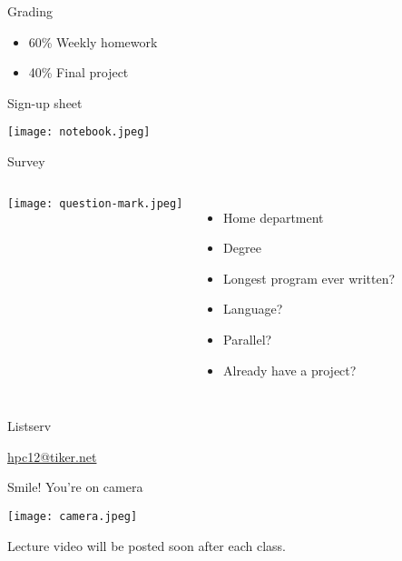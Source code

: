 \documentclass[english,compress]{beamer}
\begin{document}
\begin{frame}{Grading}
  \Large
  \begin{itemize}
    \item 60\% Weekly homework
    \item 40\% Final project
  \end{itemize}
\end{frame}
\begin{frame}{Sign-up sheet}
  \begin{center}
    \texttt{[image: notebook.jpeg]}
  \end{center}
\end{frame}
\begin{frame}{Survey}
  \begin{columns}
    \texttt{[image: question-mark.jpeg]}
    \begin{itemize}[<+->]
      \item Home department
      \item Degree
      \item Longest program ever written?
      \item Language?
      \item Parallel?
      \item Already have a project?
    \end{itemize}
  \end{columns}
\end{frame}
\begin{frame}{Listserv}
  \begin{center}
    \Huge
    \href{mailto:hpc12@tiker.net}{hpc12@tiker.net}
  \end{center}
\end{frame}
\begin{frame}{Smile! You're on camera}
  \begin{center}
    \texttt{[image: camera.jpeg]}

    Lecture video will be posted soon after each class.
  \end{center}
\end{frame}
\end{document}
